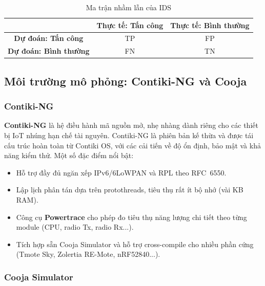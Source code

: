 \begin{table}[H]
\centering
\caption{Ma trận nhầm lẫn của IDS}
\label{tab:confusion_matrix}
\begin{tabularx}{0.7\textwidth}{C{1} C{1.2} C{1.2}}
    \toprule
    & \textbf{Thực tế: Tấn công} & \textbf{Thực tế: Bình thường} \\
    \midrule
    \textbf{Dự đoán: Tấn công}   & TP & FP \\
    \textbf{Dự đoán: Bình thường} & FN & TN \\
    \bottomrule
\end{tabularx}
\end{table}

\subsection{Môi trường mô phỏng: Contiki-NG và Cooja}
\label{subsec:simulation_env}

\subsubsection{Contiki-NG}

\textbf{Contiki-NG} là hệ điều hành mã nguồn mở, nhẹ nhàng dành riêng
cho các thiết bị IoT nhúng hạn chế tài nguyên. Contiki-NG là phiên bản
kế thừa và được tái cấu trúc hoàn toàn từ Contiki OS, với các cải tiến
về độ ổn định, bảo mật và khả năng kiểm thử. Một số đặc điểm nổi bật:

\begin{itemize}
    \item Hỗ trợ đầy đủ ngăn xếp IPv6/6LoWPAN và RPL theo RFC~6550.
    \item Lập lịch phân tán dựa trên protothreads, tiêu thụ rất ít bộ
          nhớ (vài KB RAM).
    \item Công cụ \textbf{Powertrace} cho phép đo tiêu thụ năng lượng
          chi tiết theo từng module (CPU, radio Tx, radio Rx...).
    \item Tích hợp sẵn Cooja Simulator và hỗ trợ cross-compile cho
          nhiều phần cứng (Tmote Sky, Zolertia RE-Mote, nRF52840...).
\end{itemize}

\subsubsection{Cooja Simulator}

